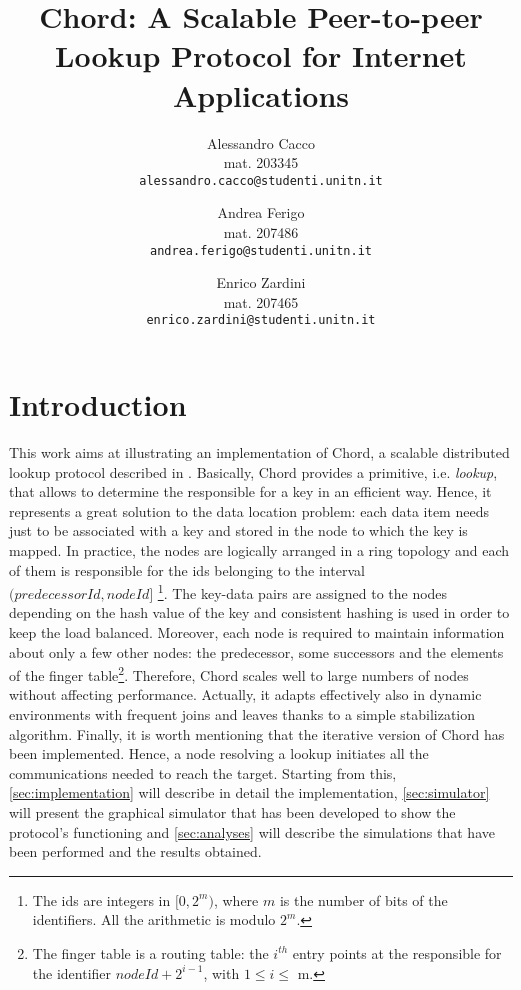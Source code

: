 \documentclass[11pt,twocolumn,letterpaper]{article}
\begin{document}
	
	\title{Chord: A Scalable Peer-to-peer Lookup Protocol for Internet Applications}
	
	\author{Alessandro Cacco\\
		mat. 203345\\
		{\tt\small alessandro.cacco@studenti.unitn.it}
		\and
		Andrea Ferigo\\
		mat. 207486\\
		{\tt\small andrea.ferigo@studenti.unitn.it}
		\and
		Enrico Zardini\\
		mat. 207465\\
		{\tt\small enrico.zardini@studenti.unitn.it}
	}
	\date{}
	\maketitle
	
	\section{Introduction}
	\label{sec:intro}
	This work aims at illustrating an implementation of Chord, a scalable distributed lookup protocol described in \cite{chord}. Basically, Chord provides a primitive, i.e. \textit{lookup}, that allows to determine the responsible for a key in an efficient way. Hence, it represents a great solution to the data location problem: each data item needs just to be associated with a key and stored in the node to which the key is mapped. \newline 
	In practice, the nodes are logically arranged in a ring topology and each of them is responsible for the ids belonging to the interval $(predecessorId, nodeId]$ \footnote{The ids are integers in $[0,2^m)$, where $m$ is the number of bits of the identifiers. All the arithmetic is modulo $2^m$.}. The key-data pairs are assigned to the nodes depending on the hash value of the key and consistent hashing is used in order to keep the load balanced. Moreover, each node is required to maintain information about only a few other nodes: the predecessor, some successors and the elements of the finger table\footnote{The finger table is a routing table: the $i^{th}$ entry points at the responsible for the identifier $nodeId+2^{i-1}$, with $1\leq i \leq$ m.\label{foot:ftable}}. Therefore, Chord scales well to large numbers of nodes without affecting performance. Actually, it adapts effectively also in dynamic environments with frequent joins and leaves thanks to a simple stabilization algorithm. \newline
	Finally, it is worth mentioning that the iterative version of Chord has been implemented. Hence, a node resolving a lookup initiates all the communications needed to reach the target. \newline
	Starting from this, \cref{sec:implementation} will describe in detail the implementation, \cref{sec:simulator} will present the graphical simulator that has been developed to show the protocol's functioning and \cref{sec:analyses} will describe the simulations that have been performed and the results obtained. 
	
\end{document}
